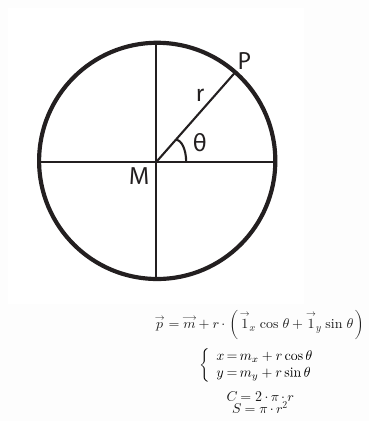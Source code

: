       \includegraphics{Figuren/Cirkel.pdf}
	 \[
      \vec{p} = \vec{m} + r \cdot \left(\vec{1}_x \cos \theta  + \vec{1}_y \sin \theta \right)
    \]
    \[
      \left\{
        \begin{array}[h]{l@{\,=\,}l}
          x & m_x + r \cos \theta\\
          y & m_y + r \sin \theta\\
        \end{array}
      \right.
    \]
    \[
      C = 2 \cdot \pi \cdot r
    \]
    \[
      S = \pi \cdot r^2
    \]


